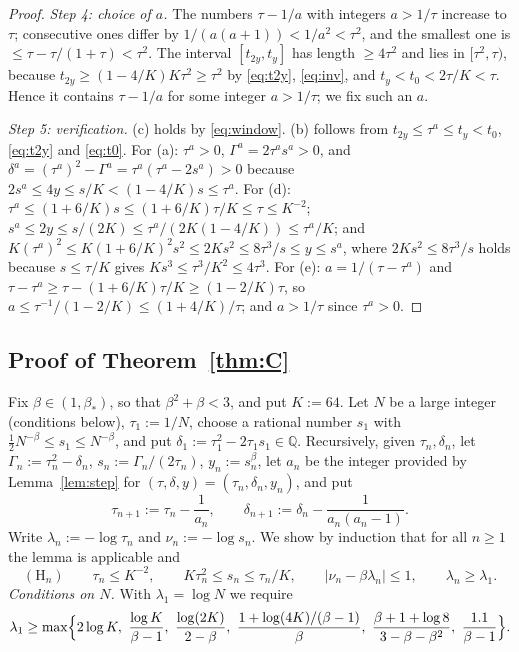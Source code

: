 \documentclass[11pt]{amsart}
\theoremstyle{definition}
\theoremstyle{remark}
\newcommand{\Q}{\mathbb{Q}}
\begin{document}
\begin{proof}
\emph{Step 4: choice of $a$.} The numbers $\tau-1/a$ with integers $a>1/\tau$ increase
to $\tau$; consecutive ones differ by $1/(a(a+1))<1/a^2<\tau^2$, and the smallest one
is $\le\tau-\tau/(1+\tau)<\tau^2$. The interval $[t_{2y},t_y]$ has length $\ge4\tau^2$ and
lies in $[\tau^2,\tau)$, because $t_{2y}\ge(1-4/K)K\tau^2\ge\tau^2$ by \eqref{eq:t2y},
\eqref{eq:inv}, and $t_y<t_0<2\tau/K<\tau$. Hence it contains $\tau-1/a$ for some
integer $a>1/\tau$; we fix such an $a$.

\emph{Step 5: verification.} (c) holds by \eqref{eq:window}. (b) follows from
$t_{2y}\le\tau^a\le t_y<t_0$, \eqref{eq:t2y} and \eqref{eq:t0}. For (a): $\tau^a>0$,
$\Gamma^a=2\tau^as^a>0$, and $\delta^a=(\tau^a)^2-\Gamma^a=\tau^a(\tau^a-2s^a)>0$ because
$2s^a\le4y\le s/K<(1-4/K)s\le\tau^a$. For (d): $\tau^a\le(1+6/K)s\le(1+6/K)\tau/K\le\tau\le
K^{-2}$; $s^a\le2y\le s/(2K)\le\tau^a/(2K(1-4/K))\le\tau^a/K$; and
$K(\tau^a)^2\le K(1+6/K)^2s^2\le 2Ks^2\le 8\tau^3/s\le y\le s^a$, where
$2Ks^2\le8\tau^3/s$ holds because $s\le\tau/K$ gives $Ks^3\le\tau^3/K^2\le4\tau^3$.
For (e): $a=1/(\tau-\tau^a)$ and
$\tau-\tau^a\ge\tau-(1+6/K)\tau/K\ge(1-2/K)\tau$, so $a\le\tau^{-1}/(1-2/K)\le(1+4/K)/\tau$;
and $a>1/\tau$ since $\tau^a>0$.
\end{proof}

\subsection{Proof of Theorem~\ref{thm:C}}
Fix $\beta\in(1,\beta_*)$, so that $\beta^2+\beta<3$, and put $K:=64$. Let $N$ be a
large integer (conditions below), $\tau_1:=1/N$, choose a rational number $s_1$ with
$\tfrac12N^{-\beta}\le s_1\le N^{-\beta}$, and put $\delta_1:=\tau_1^2-2\tau_1s_1\in\Q$.
Recursively, given $\tau_n,\delta_n$, let $\Gamma_n:=\tau_n^2-\delta_n$,
$s_n:=\Gamma_n/(2\tau_n)$, $y_n:=s_n^{\beta}$, let $a_n$ be the integer provided by
Lemma~\ref{lem:step} for $(\tau,\delta,y)=(\tau_n,\delta_n,y_n)$, and put
\[
\tau_{n+1}:=\tau_n-\frac1{a_n},\qquad \delta_{n+1}:=\delta_n-\frac1{a_n(a_n-1)} .
\]
Write $\lambda_n:=-\log\tau_n$ and $\nu_n:=-\log s_n$. We show by induction that for all
$n\ge1$ the lemma is applicable and
\[
(\mathrm H_n)\qquad \tau_n\le K^{-2},\qquad K\tau_n^2\le s_n\le\tau_n/K,\qquad
|\nu_n-\beta\lambda_n|\le1,\qquad \lambda_n\ge\lambda_1 .
\]
\emph{Conditions on $N$.} With $\lambda_1=\log N$ we require
\begin{equation}\label{eq:Nlarge}
\lambda_1\ge\max\Bigl\{2\log K,\ \frac{\log K}{\beta-1},\ \frac{\log(2K)}{2-\beta},\
\frac{1+\log(4K)/(\beta-1)}{\beta},\ \frac{\beta+1+\log8}{3-\beta-\beta^2},\
\frac{1.1}{\beta-1}\Bigr\}.
\end{equation}
\end{document}
